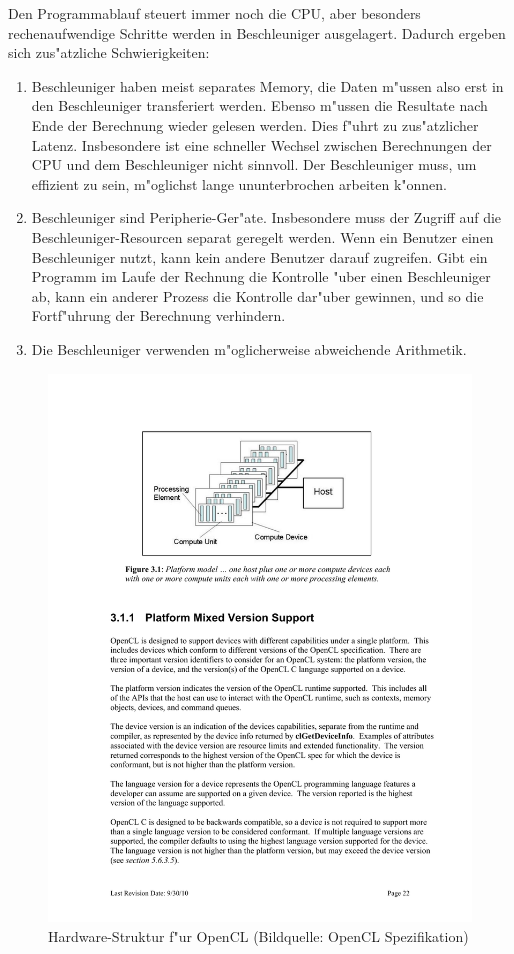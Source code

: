 Den Programmablauf steuert immer noch die CPU, aber besonders
rechenaufwendige Schritte werden in Beschleuniger ausgelagert.
Dadurch ergeben sich zus"atzliche Schwierigkeiten:
\begin{enumerate}
\item Beschleuniger haben meist separates Memory, die Daten m"ussen also
erst in den Beschleuniger transferiert werden. Ebenso m"ussen die Resultate
nach Ende der Berechnung wieder gelesen werden.
Dies f"uhrt zu zus"atzlicher Latenz.
Insbesondere ist eine schneller Wechsel zwischen Berechnungen der CPU 
und dem Beschleuniger nicht sinnvoll.
Der Beschleuniger muss, um effizient zu sein, m"oglichst lange ununterbrochen
arbeiten k"onnen.
\item Beschleuniger sind Peripherie-Ger"ate.
Insbesondere muss der Zugriff auf die Beschleuniger-Resourcen separat
geregelt werden. 
Wenn ein Benutzer einen Beschleuniger nutzt, kann kein andere Benutzer
darauf zugreifen. Gibt ein Programm im Laufe der Rechnung die Kontrolle
"uber einen Beschleuniger ab, kann ein anderer Prozess die Kontrolle dar"uber
gewinnen, und so die Fortf"uhrung der Berechnung verhindern.
\item Die Beschleuniger verwenden m"oglicherweise abweichende Arithmetik.
\end{enumerate}
\begin{figure}
\begin{center}
\includegraphics[width=0.8\hsize]{images/opencl-platform.pdf}
\end{center}
\caption{Hardware-Struktur f"ur OpenCL (Bildquelle: OpenCL Spezifikation)
\label{hardware:opencl}}
\end{figure}
